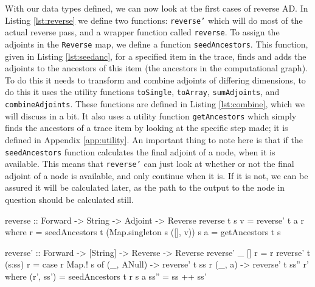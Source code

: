         With our data types defined, we can now look at the first cases of reverse AD.
        In Listing \ref{lst:reverse} we define two functions: \texttt{reverse'} which will do most of the actual reverse pass, and a wrapper function called \texttt{reverse}.
        To assign the adjoints in the \texttt{Reverse} map, we define a function \texttt{seedAncestors}.
        This function, given in Listing \ref{lst:seedanc}, for a specified item in the trace, finds and adds the adjoints to the ancestors of this item (the ancestors in the computational graph).
        To do this it needs to transform and combine adjoints of differing dimensions, to do this it uses the utility functions \texttt{toSingle}, \texttt{toArray}, \texttt{sumAdjoints}, and \texttt{combineAdjoints}.
        These functions are defined in Listing \ref{lst:combine}, which we will discuss in a bit.
        It also uses a utility function \texttt{getAncestors} which simply finds the ancestors of a trace item by looking at the specific step made; it is defined in Appendix \ref{app:utility}.
        An important thing to note here is that if the \texttt{seedAncestors} function calculates the final adjoint of a node, when it is available.
        This means that \texttt{reverse'} can just look at whether or not the final adjoint of a node is available, and only continue when it is.
        If it is not, we can be assured it will be calculated later, as the path to the output to the node in question should be calculated still. %
        
        \begin{haskell}[caption={The reverse pass function. \texttt{reverse} takes in a forward-pass trace, the name of the output of the program as a string, and the seed value (the adjoint of the output); and outputs a map containing all adjoints. \texttt{reverse'} takes in a forward-pass trace, a queue of items in the trace that still need to be passed on the reverse pass, and the current map of adjoints; and ouptuts the updated map of adjoints (from resolving the first item in the queue).}, label=lst:reverse, gobble=12]
            reverse :: Forward -> String -> Adjoint -> Reverse
            reverse t s v = reverse' t a r
                where
                    r = seedAncestors t (Map.singleton s ([], v)) s
                    a = getAncestors t s

            reverse' :: Forward -> [String] -> Reverse -> Reverse
            reverse' _ []     r = r
            reverse' t (s:ss) r = case r Map.! s of
                (_, ANull) -> reverse' t ss r
                (_, a)     -> reverse' t ss'' r'
                where
                    (r', ss') = seedAncestors t r s a
                    ss''      = ss ++ ss'
        \end{haskell}

